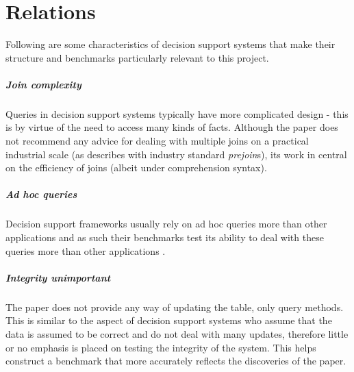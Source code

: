 \section{Relations}
Following are some characteristics of decision support systems \cite{IntroToDatabaseSystems}
that make their structure and benchmarks particularly relevant to this
project.

\subparagraph{Join complexity} Queries in decision support systems typically
have more complicated design - this is by virtue of the need to access many
kinds of facts. Although the paper \cite{RelationalAlgebraByWayOfAdjunctions}
does not recommend any advice for dealing with multiple joins on a practical
industrial scale (as \cite{IntroToDatabaseSystems} describes with industry
standard \emph{prejoin}s), its work in central on the efficiency of joins
(albeit under comprehension syntax).

\subparagraph{Ad hoc queries} Decision support frameworks usually rely on ad hoc
queries more than other applications and as such their benchmarks test its
ability to deal with these queries more than other applications
\cite{SetQueryBenchmark, PractitionersIntroduction}.

\subparagraph{Integrity unimportant} The paper does not provide any way of
updating the table, only query methods. This is similar to the aspect of
decision support systems who assume that the data is assumed to be correct and
do not deal with many updates, therefore little or no emphasis is placed on
testing the integrity of the system. This helps construct a benchmark that more
accurately reflects the discoveries of the paper.
